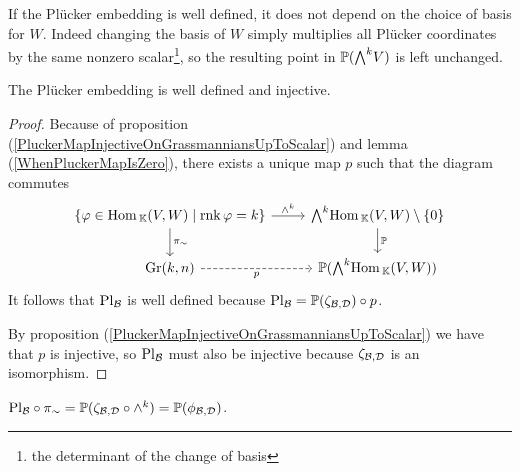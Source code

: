 \begin{remark}
If the Pl\"ucker embedding is well defined, it does not depend on the choice of basis for $W$. Indeed changing the basis of $W$ simply multiplies all Pl\"ucker coordinates by the same nonzero scalar\footnote{the determinant of the change of basis}, so the resulting point in $\Pj(\bw V)$ is left unchanged.
\end{remark}

\begin{proposition}\label{PluckerEmbeddingWellDefinedInjective}
The Pl\"ucker embedding is well defined and injective.
\end{proposition}
\begin{proof}
Because of proposition (\ref{PluckerMapInjectiveOnGrassmanniansUpToScalar}) and lemma (\ref{WhenPluckerMapIsZero}), there exists a unique map $p$ such that the diagram commutes
\[\begin{tikzcd}
	{\cpa{\vp\in \Hom_\K(V,W)\mid \rnk \vp=k}} & {\bw \Hom_\K(V,W)\nz} \\
	{\Gr(k,n)} & {\Pj(\bw \Hom_\K(V,W))}
	\arrow["{\wedge^k}", from=1-1, to=1-2]
	\arrow["{\pi_\sim}", from=1-1, to=2-1]
	\arrow["\Pj", from=1-2, to=2-2]
	\arrow["p"', dashed, from=2-1, to=2-2]
\end{tikzcd}\]
It follows that $\mathrm{Pl}_{\mathcal{B}}$ is well defined because $\mathrm{Pl}_{\mathcal{B}}=\mathbb{P}(\zeta_{\mathcal{B},\mathcal{D}})\circ p$.

By proposition (\ref{PluckerMapInjectiveOnGrassmanniansUpToScalar}) we have that $p$ is injective, so $\mathrm{Pl}_{\mathcal{B}}$ must also be injective because $\zeta_{\mathcal{B},\mathcal{D}}$ is an isomorphism.
\end{proof}


\begin{remark}
$\mathrm{Pl}_{\mathcal{B}}\circ \pi_\sim=\mathbb{P}(\zeta_{\mathcal{B},\mathcal{D}}\circ\wedge^k)=\mathbb{P}(\phi_{\mathcal{B},\mathcal{D}})$.
\end{remark}



